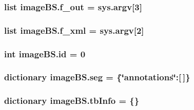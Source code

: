 \subsubsection[{f\+\_\+out}]{\setlength{\rightskip}{0pt plus 5cm}list image\+B\+S.\+f\+\_\+out = sys.\+argv\mbox{[}3\mbox{]}}\label{namespaceimage_b_s_a709f8577b5d6213a8008234dc9f65789}
\hypertarget{namespaceimage_b_s_ab38ba6a5205abed7791bba0d27249f26}{}
\subsubsection[{f\+\_\+xml}]{\setlength{\rightskip}{0pt plus 5cm}list image\+B\+S.\+f\+\_\+xml = sys.\+argv\mbox{[}2\mbox{]}}\label{namespaceimage_b_s_ab38ba6a5205abed7791bba0d27249f26}
\hypertarget{namespaceimage_b_s_a26bd6c671dd10d4d3b2fb1a1765a1df5}{}
\subsubsection[{id}]{\setlength{\rightskip}{0pt plus 5cm}int image\+B\+S.\+id = 0}\label{namespaceimage_b_s_a26bd6c671dd10d4d3b2fb1a1765a1df5}
\hypertarget{namespaceimage_b_s_aa1b3cff79bc269fd970cb3cc994855a3}{}
\subsubsection[{seg}]{\setlength{\rightskip}{0pt plus 5cm}dictionary image\+B\+S.\+seg = \{\char`\"{}annotations\char`\"{}\+:\mbox{[}$\,$\mbox{]}\}}\label{namespaceimage_b_s_aa1b3cff79bc269fd970cb3cc994855a3}
\hypertarget{namespaceimage_b_s_a3ba54cc10f742919e009dff42143c281}{}
\subsubsection[{tb\+Info}]{\setlength{\rightskip}{0pt plus 5cm}dictionary image\+B\+S.\+tb\+Info = \{\}}\label{namespaceimage_b_s_a3ba54cc10f742919e009dff42143c281}

